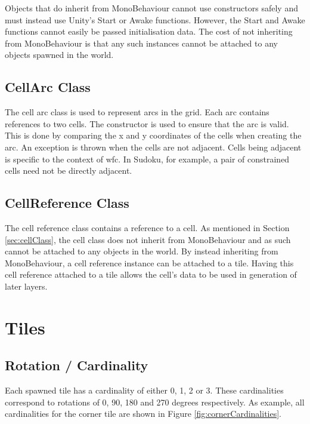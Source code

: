 Objects that do inherit from MonoBehaviour cannot use constructors safely and must instead use Unity's Start or Awake functions. However, the Start and Awake functions cannot easily be passed initialisation data. The cost of not inheriting from MonoBehaviour is that any such instances cannot be attached to any objects spawned in the world.

\subsection{CellArc Class}
The cell arc class is used to represent arcs in the grid. Each arc contains references to two cells. The constructor is used to ensure that the arc is valid. This is done by comparing the x and y coordinates of the cells when creating the arc. An exception is thrown when the cells are not adjacent. Cells being adjacent is specific to the context of \acrshort{wfc}. In Sudoku, for example, a pair of constrained cells need not be directly adjacent.


\subsection{CellReference Class}\label{sec:cellReferenceClass}
The cell reference class contains a reference to a cell. As mentioned in Section \ref{sec:cellClass}, the cell class does not inherit from MonoBehaviour and as such cannot be attached to any objects in the world. By instead inheriting from MonoBehaviour, a cell reference instance can be attached to a tile. Having this cell reference attached to a tile allows the cell's data to be used in generation of later layers.


\section{Tiles}
\subsection{Rotation / Cardinality}
Each spawned tile has a cardinality of either 0, 1, 2 or 3. These cardinalities correspond to rotations of 0, 90, 180 and 270 degrees respectively. As example, all cardinalities for the corner tile are shown in Figure \ref{fig:cornerCardinalities}.

